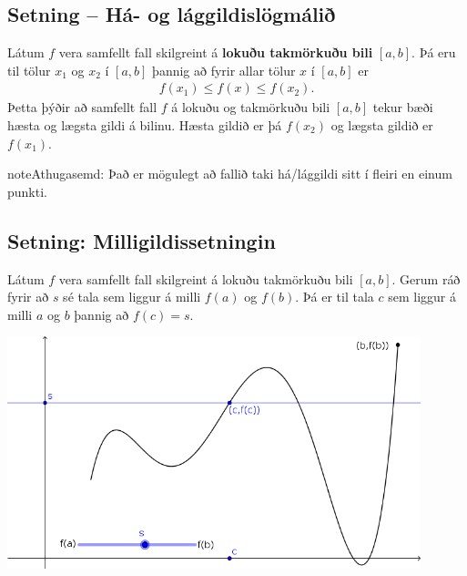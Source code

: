 \documentclass[b5paper,11pt,icelandic]{sphinxmanual}
\begin{document}
\subsection{Setning – Há- og lággildislögmálið}
\label{kafli02:ha-og-laggildislogmali}\label{kafli02:setning-ha-og-laggildislogmali}\label{kafli02:index-12}
Látum \(f\) vera samfellt fall skilgreint á \textbf{lokuðu takmörkuðu bili}
\([a,b]\). Þá eru til tölur \(x_1\) og \(x_2\) í
\([a,b]\) þannig að fyrir allar tölur \(x\) í \([a,b]\) er
\begin{equation*}
\begin{split}f(x_1)\leq f(x)\leq f(x_2).\end{split}
\end{equation*}
Þetta þýðir að samfellt fall \(f\) á lokuðu og takmörkuðu bili
\([a,b]\) tekur bæði hæsta og lægsta gildi á bilinu. Hæsta gildið er
þá \(f(x_2)\) og lægsta gildið er \(f(x_1)\).

\begin{notice}{note}{Athugasemd:}
Það er mögulegt að fallið taki há/lággildi sitt í fleiri en einum
punkti.
\end{notice}


\subsection{Setning: Milligildissetningin}
\label{kafli02:index-13}\label{kafli02:setning-milligildissetningin}
Látum \(f\) vera samfellt fall skilgreint á lokuðu takmörkuðu bili
\([a,b]\). Gerum ráð fyrir að \(s\) sé tala sem liggur á milli
\(f(a)\) og \(f(b)\). Þá er til tala \(c\) sem liggur á
milli \(a\) og \(b\) þannig að \(f(c)=s\).


\begin{center}
\includegraphics[width=12cm,keepaspectratio=true]{10_milligildissetn.png}
\end{center}
\end{document}
